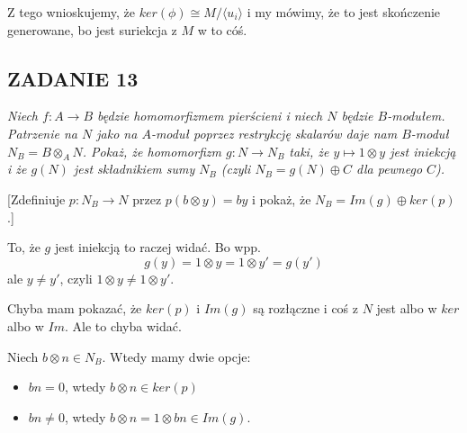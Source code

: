 \documentclass{article}
\begin{document}
Z tego wnioskujemy, że $ker(\phi)\cong M/\langle u_i\rangle$ i my mówimy, że to jest skończenie generowane, bo jest suriekcja z $M$ w to cóś.

\subsection*{ZADANIE 13}
{\slshape\color{blue}Niech $f:A\to B$ będzie homomorfizmem pierścieni i niech $N$ będzie $B$-modułem. Patrzenie na $N$ jako na $A$-moduł poprzez restrykcję skalarów daje nam $B$-moduł $N_B=B\otimes_AN$. Pokaż, że homomorfizm $g:N\to N_B$ taki, że $y\mapsto1\otimes y$ jest iniekcją i że $g(N)$ jest składnikiem sumy $N_B$ (czyli $N_B=g(N)\oplus C$ dla pewnego $C$).

[Zdefiniuje $p:N_B\to N$ przez $p(b\otimes y)=by$ i pokaż, że $N_B=Im(g)\oplus ker(p)$.]}

To, że $g$ jest iniekcją to raczej widać. Bo wpp. 
$$g(y)=1\otimes y=1\otimes y'=g(y')$$
ale $y\neq y'$, czyli $1\otimes y\neq 1\otimes y'$.

Chyba mam pokazać, że $ker(p)$ i $Im(g)$ są rozłączne i coś z $N$ jest albo w $ker$ albo w $Im$. Ale to chyba widać.

Niech $b\otimes n\in N_B$. Wtedy mamy dwie opcje:
\begin{itemize}
    \item $bn=0$, wtedy $b\otimes n\in ker(p)$
    \item $bn\neq 0$, wtedy $b\otimes n=1\otimes bn\in Im(g)$.
\end{itemize}
\end{document}
